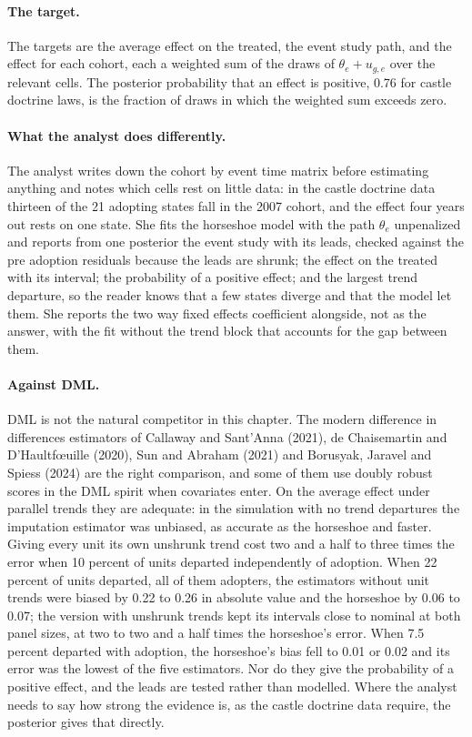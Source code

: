 \paragraph{The target.} The targets are the average effect on the treated, the event study path, and the effect for each cohort, each a weighted sum of the draws of $\theta_e + u_{g,e}$ over the relevant cells. The posterior probability that an effect is positive, 0.76 for castle doctrine laws, is the fraction of draws in which the weighted sum exceeds zero.

\paragraph{What the analyst does differently.} The analyst writes down the cohort by event time matrix before estimating anything and notes which cells rest on little data: in the castle doctrine data thirteen of the 21 adopting states fall in the 2007 cohort, and the effect four years out rests on one state. She fits the horseshoe model with the path $\theta_e$ unpenalized and reports from one posterior the event study with its leads, checked against the pre adoption residuals because the leads are shrunk; the effect on the treated with its interval; the probability of a positive effect; and the largest trend departure, so the reader knows that a few states diverge and that the model let them. She reports the two way fixed effects coefficient alongside, not as the answer, with the fit without the trend block that accounts for the gap between them.

\paragraph{Against DML.} DML is not the natural competitor in this chapter. The modern difference in differences estimators of Callaway and Sant'Anna (2021), de Chaisemartin and D'Haultf\oe uille (2020), Sun and Abraham (2021) and Borusyak, Jaravel and Spiess (2024) are the right comparison, and some of them use doubly robust scores in the DML spirit when covariates enter. On the average effect under parallel trends they are adequate: in the simulation with no trend departures the imputation estimator was unbiased, as accurate as the horseshoe and faster. Giving every unit its own unshrunk trend cost two and a half to three times the error when 10 percent of units departed independently of adoption. When 22 percent of units departed, all of them adopters, the estimators without unit trends were biased by 0.22 to 0.26 in absolute value and the horseshoe by 0.06 to 0.07; the version with unshrunk trends kept its intervals close to nominal at both panel sizes, at two to two and a half times the horseshoe's error. When 7.5 percent departed with adoption, the horseshoe's bias fell to 0.01 or 0.02 and its error was the lowest of the five estimators. Nor do they give the probability of a positive effect, and the leads are tested rather than modelled. Where the analyst needs to say how strong the evidence is, as the castle doctrine data require, the posterior gives that directly.

